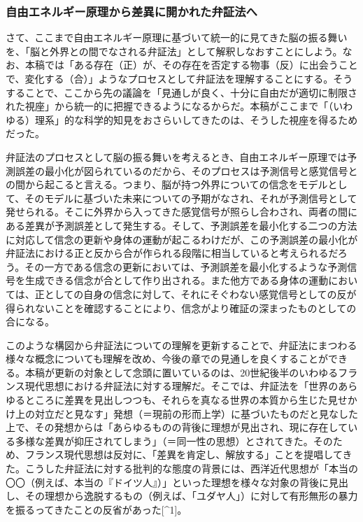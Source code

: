 \subsubsection{自由エネルギー原理から差異に開かれた弁証法へ}\label{ux81eaux7531ux30a8ux30cdux30ebux30aeux30fcux539fux7406ux304bux3089ux5deeux7570ux306bux958bux304bux308cux305fux5f01ux8a3cux6cd5ux3078}

さて、ここまで自由エネルギー原理に基づいて統一的に見てきた脳の振る舞いを、「脳と外界との間でなされる弁証法」として解釈しなおすことにしよう。なお、本稿では「ある存在（正）が、その存在を否定する物事（反）に出会うことで、変化する（合）」ようなプロセスとして弁証法を理解することにする。そうすることで、ここから先の議論を「見通しが良く、十分に自由だが適切に制限された視座」から統一的に把握できるようになるからだ。本稿がここまで「（いわゆる）理系」的な科学的知見をおさらいしてきたのは、そうした視座を得るためだった。

弁証法のプロセスとして脳の振る舞いを考えるとき、自由エネルギー原理では予測誤差の最小化が図られているのだから、そのプロセスは予測信号と感覚信号との間から起こると言える。つまり、脳が持つ外界についての信念をモデルとして、そのモデルに基づいた未来についての予期がなされ、それが予測信号として発せられる。そこに外界から入ってきた感覚信号が照らし合わされ、両者の間にある差異が予測誤差として発生する。そして、予測誤差を最小化する二つの方法に対応して信念の更新や身体の運動が起こるわけだが、この予測誤差の最小化が弁証法における正と反から合が作られる段階に相当していると考えられるだろう。その一方である信念の更新においては、予測誤差を最小化するような予測信号を生成できる信念が合として作り出される。また他方である身体の運動においては、正としての自身の信念に対して、それにそぐわない感覚信号としての反が得られないことを確認することにより、信念がより確証の深まったものとしての合になる。

このような構図から弁証法についての理解を更新することで、弁証法にまつわる様々な概念についても理解を改め、今後の章での見通しを良くすることができる。本稿が更新の対象として念頭に置いているのは、20世紀後半のいわゆるフランス現代思想における弁証法に対する理解だ。そこでは、弁証法を「世界のあらゆるところに差異を見出しつつも、それらを真なる世界の本質から生じた見せかけ上の対立だと見なす」発想（＝現前の形而上学）に基づいたものだと見なした上で、その発想からは「あらゆるものの背後に理想が見出され、現に存在している多様な差異が抑圧されてしまう」（＝同一性の思想）とされてきた。そのため、フランス現代思想は反対に、「差異を肯定し、解放する」ことを提唱してきた。こうした弁証法に対する批判的な態度の背景には、西洋近代思想が「本当の〇〇（例えば、本当の『ドイツ人』）」といった理想を様々な対象の背後に見出し、その理想から逸脱するもの（例えば、「ユダヤ人」）に対して有形無形の暴力を振るってきたことの反省があった{[}\^{}1{]}。

